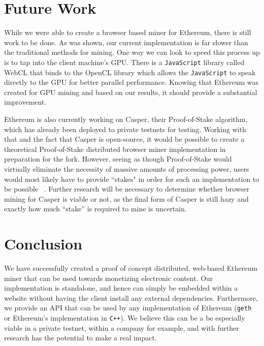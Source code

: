 \documentclass[runningheads]{llncs}
\begin{document}
\section{Future Work}

While we were able to create a browser based miner for Ethereum, there is still work to be done. As was shown, our current implementation is far slower than the traditional methods for mining. One way we can look to speed this process up is to tap into the client machine's GPU. There is a \verb|JavaScript| library called WebCL that binds to the OpenCL library which allows the \verb|JavaScript| to speak directly to the GPU for better parallel performance. Knowing that Ethereum was created for GPU mining and based on our results, it should provide a substantial improvement. 

Ethereum is also currently working on Casper, their Proof-of-Stake algorithm, which has already been deployed to private testnets for testing. Working with that and the fact that Casper is open-source, it would be possible to create a theoretical Proof-of-Stake distributed browser miner implementation in preparation for the fork. However, seeing as though Proof-of-Stake would virtually eliminate the necessity of massive amounts of processing power, users would most likely have to provide ``stakes" in order for such an implementation to be possible ~\cite{PoSproof}. Further research will be necessary to determine whether browser mining for Casper is viable or not, as the final form of Casper is still hazy and exactly how much ``stake'' is required to mine is uncertain.


\section{Conclusion}
We have successfully created a proof of concept distributed, web-based Ethereum miner that can be used towards monetizing electronic content. Our implementation is standalone, and hence can simply be embedded within a website without having the client install any external dependencies. Furthermore, we provide an API that can be used by any implementation of Ethereum (\verb|geth| or Ethereum's implementation in \verb|C++|). We believe this can be a be especially viable in a private testnet, within a company for example, and with further research has the potential to make a real impact.
\end{document}
